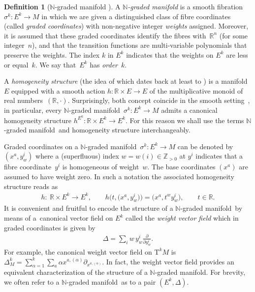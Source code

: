 \documentclass[pdftex]{sigma}
\newcommand{\grB}{{$\N$-graded manifold}}
\newcommand{\degree}{{order}}
\newcommand{\R}{\mathbb{R}}
\newcommand{\Z}{\mathbb{Z}}
\newcommand{\N}{\mathbb{N}}
\newcommand{\pa}{\partial}
\newcommand{\ra}{\rightarrow}
\newcommand{\TT}[1]{\mathrm{T}^{#1}} %
\numberwithin{equation}{section}
\theoremstyle{definition}
\newtheorem{df}[thm]{Definition}
\begin{document}
\begin{df}[$\N$-graded manifold \cite{Voronov_2002}]\label{def:gr_bund}
 A \emph{$\N$-graded manifold} is a smooth fibration \mbox{$\sigma^k\colon\! E^k{\ra} M$} in which we are given a distinguished class of fibre coordinates (called \emph{graded coordinates}) with non-negative integer \emph{weights} assigned. Moreover, it is assumed that these graded coordinates identify the fibres with~$\R^n$ (for some integer~$n$), and that the transition functions are multi-variable polynomials that preserve the weights. The index $k$ in $E^k$ indicates that the weights on $E^k$ are less or equal~$k$. We say that~$E^k$ has \emph{\degree}~$k$.

A \emph{homogeneity structure} (the idea of which dates back at least to \cite{Severa_2005}) is a manifold~$E$ equipped with a smooth action $h\colon \R\times E\ra E$ of the multiplicative monoid of real num\-bers~$(\R, \cdot)$. Surprisingly, both concept coincide in the smooth setting~\cite[Theorem~4.2]{JG_MR_gr_bund_hgm_str_2011}, in particular, every \grB\ $\sigma^k\colon E^k\ra M$ admits a canonical homogeneity structure \mbox{$h^{E^k}\colon \R\times E^k\ra E^k$}. For this reason we shall use the terms \grB\ and homogeneity structure interchangeably.
\end{df}

Graded coordinates on a \grB\ $\sigma^k\colon E^k \ra M$ can be denoted by $(x^a, y^i_w)$ where a (superfluous) index $w=w(i)\in \Z_{>0}$ at $y^i$ indicates that a fibre coordinate~$y^i$ is homogeneous of weight~$w$. The base coordinates $(x^a)$ are assumed to have weight zero. In such a notation the associated homogeneity structure reads as
\begin{gather*}
h\colon \ \R \times E^k \ra E^k, \qquad h\big(t, \big(x^a, y^i_w\big)\big) = \big( x^a, t^w y^i_w\big), \qquad t\in \R.
\end{gather*}
It is convenient and fruitful to encode the structure of a \grB\ by means of a~canonical vector field on $E^k$ called the \emph{weight vector field} which in graded coordinates is given by
\begin{gather*}
 \Delta = \sum_i w\, y^i_w \frac{\pa}{\pa y^i_w}.
\end{gather*}
 For example, the canonical weight vector field on $\TT{k} M$ is
$ \Delta_M^k = \sum_{\alpha = 1}^k \sum_a \alpha x^{a, (\alpha)} \pa_{x^{a, (\alpha)}}$. In fact, the weight vector field provides an equivalent characterization of the structure of a \grB. For brevity, we often refer to a \grB\ as to a pair $(E^k, \Delta)$.
\end{document}
